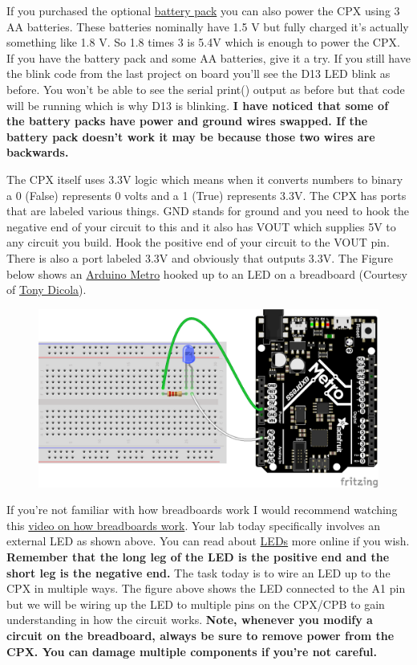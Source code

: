 If you purchased the optional
\href{https://www.adafruit.com/product/3287}{battery pack} you can
also power the CPX using 3 AA batteries. These batteries nominally
have 1.5 V but fully 
charged it's actually something like 1.8 V. So 1.8 times 3 is 5.4V
which is enough to power the CPX. If you have the battery pack and
some AA batteries, give it a try. If you still have the blink code
from the last project on board you’ll see the D13 LED blink as
before. You won’t be able to see the serial print() output as before
but that code will be running which is why D13 is blinking. {\bf I have
noticed that some of the battery packs have power and ground wires
swapped. If the battery pack doesn’t work it may be because those two
wires are backwards.}

The CPX itself uses 3.3V logic which means when it converts numbers to
binary a 0 (False) represents 0 volts and a 1 (True) represents
3.3V. The CPX has ports that are labeled various things. GND stands
for ground and you need to hook the negative end of your circuit to
this and it also has VOUT which supplies 5V to any circuit you
build. Hook the positive end of your circuit to the VOUT pin. There is
also a port labeled 3.3V and obviously that outputs 3.3V. The Figure below shows an \href{https://learn.adafruit.com/circuitpython-digital-inputs-and-outputs/digital-outputs
}{Arduino Metro} hooked up to an LED on a breadboard (Courtesy of \href{https://learn.adafruit.com/u/tdicola}{Tony Dicola}).
\begin{figure}[H]
  \begin{center}
    \includegraphics[width=\textwidth]{Figures/circuitpython_01_digital_io_figure_1.png}
  \end{center}
\end{figure}
If you’re not familiar with how breadboards work I would recommend watching this \href{https://www.youtube.com/watch?v=mE33WpRWrXs}{video on how
breadboards work}. Your lab today specifically involves an external
LED as shown above. You can read about
\href{https://learn.sparkfun.com/tutorials/light-emitting-diodes-leds/}{LEDs}
more online if you wish. {\bf Remember that the long leg of the LED is 
the positive end and the short leg is the negative end.} The task today
is to wire an LED up to the CPX in multiple ways. The figure above shows the LED connected to the A1 pin but we will be wiring up the LED to multiple pins on the CPX/CPB to gain understanding in how the circuit works. {\bf Note, whenever you modify a circuit on the breadboard, always be sure to remove power from the CPX. You can damage multiple components if you’re not careful.}

